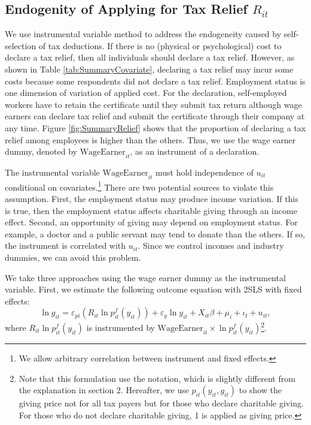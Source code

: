 \documentclass[
  11pt,
  a4paper,
]{article}
\begin{document}
\hypertarget{endogenity-of-applying-for-tax-relief-r_it}{%
\subsection{\texorpdfstring{Endogenity of Applying for Tax Relief \(R_{it}\)}{Endogenity of Applying for Tax Relief R\_\{it\}}}\label{endogenity-of-applying-for-tax-relief-r_it}}

We use instrumental variable method to address the endogeneity caused by self-selection of tax deductions.
If there is no (physical or psychological) cost to declare a tax relief,
then all individuals should declare a tax relief.
However, as shown in Table \ref{tab:SummaryCovariate},
declaring a tax relief may incur some costs because some respondents did not declare a tax relief.
Employment status is one dimension of variation of applied cost.
For the declaration, self-employed workers have to retain the certificate until they submit tax return although wage earners can declare tax relief and submit the certificate through their company at any time.
Figure \ref{fig:SummaryRelief} shows that
the proportion of declaring a tax relief among employees is higher than the others.
Thus, we use the wage earner dummy, denoted by \(\text{WageEarner}_{it}\), as an instrument of a declaration.

The instrumental variable \(\text{WageEarner}_{it}\) must hold independence of \(u_{it}\) conditional on covariates.\footnote{We allow arbitrary correlation between instrument and fixed effects.}
There are two potential sources to violate this assumption.
First, the employment status may produce income variation.
If this is true, then the employment status affects charitable giving through an income effect.
Second, an opportunity of giving may depend on employment status.
For example, a doctor and a public servant may tend to donate than the others.
If so, the instrument is correlated with \(u_{it}\).
Since we control incomes and industry dummies, we can avoid this problem.

We take three approaches using the wage earner dummy as the instrumental variable.
First, we estimate the following outcome equation with 2SLS with fixed effects:
\begin{equation}
    \ln g_{it} = \varepsilon_{pi} (R_{it} \ln p^f_{it}(y_{it})) + \varepsilon_y \ln y_{it} 
    + X_{it}\beta +\mu_i +\iota_t +u_{it}, \label{eq:stage2}
\end{equation}
where \(R_{it} \ln p^f_{it}(y_{it})\) is instrumented by
\(\text{WageEarner}_{it} \times \ln p^f_{it}(y_{it})\)\footnote{Note that this formulation use the notation, which is slightly different from the explanation in section 2. Hereafter, we use $p_{it}(y_{it}, g_{it})$ to show the giving price not for all tax payers but for those who declare charitable giving. For those who do not declare charitable giving, 1 is applied as giving price.}.
\end{document}
